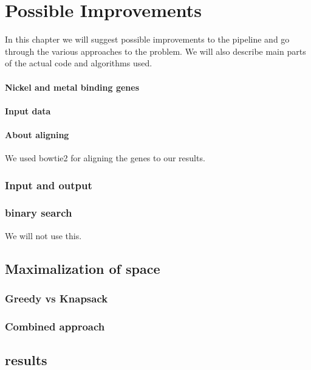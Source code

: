 \chapter[Possible Improvements]{Possible Improvements}
\label{kap:improvements}

In this chapter we will suggest possible improvements to the pipeline and go through the various approaches to the problem. 
We will also describe main parts of the actual code and algorithms used. 



\subsubsection{Nickel and metal binding genes}

\subsubsection{Input data}

\subsubsection{About aligning}
We used bowtie2 for aligning the genes to our results. 

\subsection{Input and output}

\subsection{binary search}
We will not use this. 

\section{Maximalization of space}

\subsection{Greedy vs Knapsack}

\subsection{Combined approach}

\section{results}


